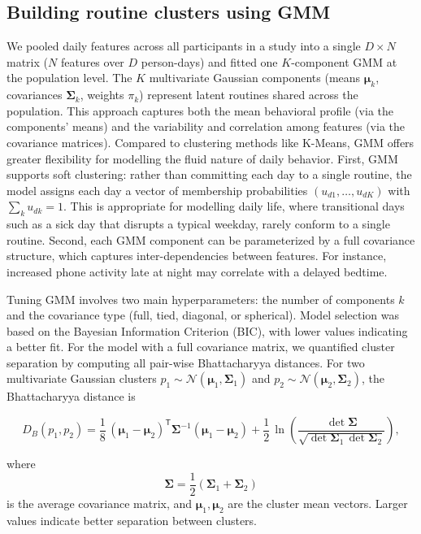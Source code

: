 \documentclass[pdflatex,sn-vancouver,Numbered]{bst/sn-jnl}%
\theoremstyle{thmstyleone}%
\theoremstyle{thmstyletwo}%
\theoremstyle{thmstylethree}%
\begin{document}
\subsection*{Building routine clusters using GMM}\label{sec:methods:building_cluster}
We pooled daily features across all participants in a study into a single $D \times N$ matrix ($N$ features over $D$ person-days) and fitted one $K$-component GMM at the population level. The $K$ multivariate Gaussian components (means $\boldsymbol{\mu}_k$, covariances $\boldsymbol{\Sigma}_k$, weights $\pi_k$) represent latent routines shared across the population. This approach captures both the mean behavioral profile (via the components' means) and the variability and correlation among features (via the covariance matrices). Compared to clustering methods like K-Means, GMM offers greater flexibility for modelling the fluid nature of daily behavior. First, GMM supports soft clustering: rather than committing each day to a single routine, the model assigns each day a vector of membership probabilities $(u_{d1}, \ldots, u_{dK})$ with $\sum_k u_{dk} = 1$. This is appropriate for modelling daily life, where transitional days such as a sick day that disrupts a typical weekday, rarely conform to a single routine. Second, each GMM component can be parameterized by a full covariance structure, which captures inter-dependencies between features. For instance, increased phone activity late at night may correlate with a delayed bedtime.

Tuning GMM involves two main hyperparameters: the number of components \(k\) and the covariance type (full, tied, diagonal, or spherical). Model selection was based on the Bayesian Information Criterion (BIC), with lower values indicating a better fit. For the model with a full covariance matrix, we quantified cluster separation by computing all pair-wise Bhattacharyya distances. For two multivariate Gaussian clusters \(p_1 \sim \mathcal{N}(\boldsymbol{\mu}_1, \boldsymbol{\Sigma}_1)\) and \(p_2 \sim \mathcal{N}(\boldsymbol{\mu}_2, \boldsymbol{\Sigma}_2)\), the Bhattacharyya distance is

\[
D_B(p_1,p_2)
    = \frac{1}{8}\,
      (\boldsymbol{\mu}_1 - \boldsymbol{\mu}_2)^{\mathsf T}
      \boldsymbol{\Sigma}^{-1}
      (\boldsymbol{\mu}_1 - \boldsymbol{\mu}_2)
      + \frac{1}{2}\,
        \ln\!\left(
          \frac{\det\boldsymbol{\Sigma}}
               {\sqrt{\det\boldsymbol{\Sigma}_1\,\det\boldsymbol{\Sigma}_2}}
        \right),
\]

where
\[
\boldsymbol{\Sigma} = \frac{1}{2} \left( \boldsymbol{\Sigma}_1 + \boldsymbol{\Sigma}_2 \right)
\]
is the average covariance matrix, and \(\boldsymbol{\mu}_1,\boldsymbol{\mu}_2\) are the cluster mean vectors. Larger values indicate better separation between clusters.
\end{document}
